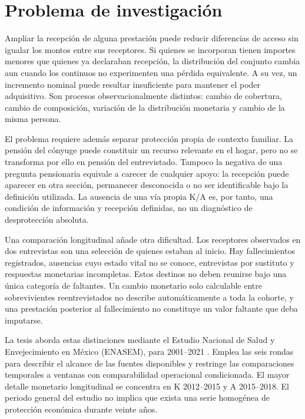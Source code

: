 \section{Problema de investigación}

Ampliar la recepción de alguna prestación puede reducir diferencias de acceso
sin igualar los montos entre sus receptores. Si quienes se incorporan tienen
importes menores que quienes ya declaraban recepción, la distribución del
conjunto cambia aun cuando los continuos no experimenten una pérdida
equivalente. A su vez, un incremento nominal puede resultar insuficiente
para mantener el poder adquisitivo. Son procesos observacionalmente distintos:
cambio de cobertura, cambio de composición, variación de la distribución
monetaria y cambio de la misma persona.

El problema requiere además separar protección propia de contexto familiar.
La pensión del cónyuge puede constituir un recurso relevante en el hogar,
pero no se transforma por ello en pensión del entrevistado. Tampoco la
negativa de una pregunta pensionaria equivale a carecer de cualquier apoyo:
la recepción puede aparecer en otra sección, permanecer desconocida o no ser
identificable bajo la definición utilizada. La ausencia de una vía propia
K/A es, por tanto, una condición de información y recepción definidas,
no un diagnóstico de desprotección absoluta.

Una comparación longitudinal añade otra dificultad. Los receptores
observados en dos entrevistas son una selección de quienes estaban al inicio.
Hay fallecimientos registrados, ausencias cuyo estado vital no se conoce,
entrevistas por sustituto y respuestas monetarias incompletas. Estos destinos
no deben reunirse bajo una única categoría de faltantes. Un cambio monetario
solo calculable entre sobrevivientes reentrevistados no describe automáticamente
a toda la cohorte, y una prestación posterior al fallecimiento no constituye
un valor faltante que deba imputarse.

La tesis aborda estas distinciones mediante el Estudio Nacional de Salud y
Envejecimiento en México (ENASEM), para 2001--2021 \citep{wong2017}. Emplea las seis
rondas para describir el alcance de las fuentes disponibles y restringe las
comparaciones temporales a ventanas con comparabilidad operacional condicionada.
El mayor detalle monetario longitudinal se concentra en K 2012--2015 y
A 2015--2018. El periodo general del estudio no implica que exista una serie
homogénea de protección económica durante veinte años.

